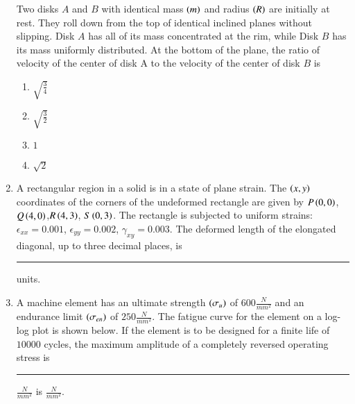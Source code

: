 \documentclass[journal]{IEEEtran}
\begin{document}
\begin{enumerate}
{Two disks $A$ and $B$ with identical mass $\left(m\right)$ and radius $\left(R\right)$ are initially at rest. They roll down from the top of identical inclined planes without slipping. Disk $A$ has all of its mass concentrated at the rim, while Disk $B$ has its mass uniformly distributed. At the bottom of the plane, the ratio of velocity of the center of disk A to the velocity of the center of disk $B$ is
\begin{multicols}{4}
\begin{enumerate}
\item $\sqrt{\frac{3}{4}}$
\item $\sqrt{\frac{3}{2}}$
\item $1$
\item $\sqrt{2}$
\end{enumerate}
\end{multicols}
}
\item{
A rectangular region in a solid is in a state of plane strain. The $\left(x,y\right)$ coordinates of the corners of the undeformed rectangle are given by $P\left(0,0\right)$,$Q\left(4,0\right)$,$R\left(4,3\right)$, $S\left(0,3\right)$. The rectangle is subjected to uniform strains:$\epsilon_{xx} = 0.001$, $\epsilon_{yy} = 0.002$, $\gamma_{xy} = 0.003$. The deformed length of the elongated diagonal, up to three decimal places, is \rule{2cm}{0.15mm} units.
}
\item{
A machine element has an ultimate strength $\left(\sigma_u\right)$ of $600\frac{N}{mm^2}$ and an endurance limit $\left(\sigma_{en}\right)$ of $250\frac{N}{mm^2}$. The fatigue curve for the element on a log-log plot is shown below. If the element is to be designed for a finite life of $10000$ cycles, the maximum amplitude of a completely reversed operating stress is \rule{2cm}{0.15mm} $\frac{N}{mm^2}$ 
 is $\frac{N}{mm^2}$.
 \begin{figure}[H]
\centering
\resizebox{5cm}{!}{%
\begin{circuitikz}
\tikzstyle{every ode}=[font=\normalsize]
\draw [->, >=Stealth] (5.25,7) -- (5.25,12);
\draw [->, >=Stealth] (5.25,7) -- (10.5,7);
\draw [dashed] (5.25,8.75) -- (7,8.75);
\draw [dashed] (7,8.75) -- (7,7);
\draw [short] (5.25,10.25) -- (7,8.75);
\draw [short] (7,8.75) -- (9.25,8.75);
\node [font=\normalsize] at (4.5,10.25) {A};
\node [font=\normalsize] at (5.75,10.5) {$0.8\sigma_u$};
\node [font=\normalsize] at (4.75,8.75) {$\sigma_{en}$};
\node [font=\normalsize] at (5,6.5) {$10^3$};
\node [font=\normalsize] at (7,6.5) {$10^6$};
\node [font=\normalsize] at (7.25,9) {B};
\node [font=\normalsize] at (7.5,5.75) {No. of cycles};
\node [font=\normalsize, rotate around={90:(0,0)}] at (3.5,9) {Faliure Stress};
\end{circuitikz}
}%


\end{figure}}
\end{enumerate}
\end{document}
